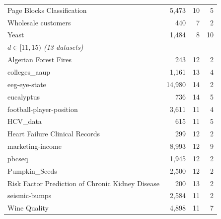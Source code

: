 \begin{tabular}{lrrr}
Page Blocks Classification & 5{,}473 & 10 & 5 \\
Wholesale customers & 440 & 7 & 2 \\
Yeast & 1{,}484 & 8 & 10 \\
\midrule
\multicolumn{4}{l}{\emph{$d \in [11,15)$ (13 datasets)}} \\
Algerian Forest Fires & 243 & 12 & 2 \\
colleges\_aaup & 1{,}161 & 13 & 4 \\
eeg-eye-state & 14{,}980 & 14 & 2 \\
eucalyptus & 736 & 14 & 5 \\
football-player-position & 3{,}611 & 11 & 4 \\
HCV\_data & 615 & 11 & 5 \\
Heart Failure Clinical Records & 299 & 12 & 2 \\
marketing-income & 8{,}993 & 12 & 9 \\
pbcseq & 1{,}945 & 12 & 2 \\
Pumpkin\_Seeds & 2{,}500 & 12 & 2 \\
Risk Factor Prediction of Chronic Kidney Disease & 200 & 13 & 2 \\
seismic-bumps & 2{,}584 & 11 & 2 \\
Wine Quality & 4{,}898 & 11 & 7 \\
\bottomrule
\end{tabular}

